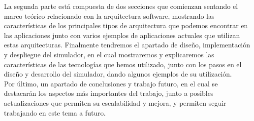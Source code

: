 La segunda parte está compuesta de dos secciones que comienzan sentando el marco teórico relacionado con la arquitectura software, mostrando las características de los principales tipos de arquitectura que podemos encontrar en las aplicaciones junto con varios ejemplos de aplicaciones actuales que utilizan estas arquitecturas. Finalmente tendremos el apartado de diseño, implementación y despliegue del simulador, en el cual mostraremos y explicaremos las características de las tecnologías que hemos utilizado, junto con los pasos en el diseño y desarrollo del simulador, dando algunos ejemplos de su utilización.\\

Por último, un apartado de conclusiones y trabajo futuro, en el cual se destacarán los aspectos más importantes del trabajo, junto a posibles actualizaciones que permiten su escalabilidad y mejora, y permiten seguir trabajando en este tema a futuro.



\endinput
